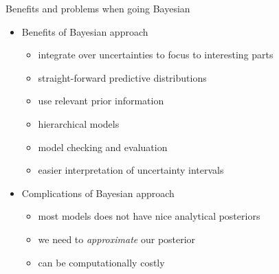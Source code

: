 \documentclass[10pt]{beamer}
\begin{document}


\begin{frame}{Benefits and problems when going Bayesian}

  \begin{itemize}
  \item Benefits of Bayesian approach
    \begin{itemize}
    \item integrate over uncertainties to focus to interesting parts
    \item straight-forward predictive distributions
    \item use relevant prior information
    \item hierarchical models
    \item model checking and evaluation
    \item easier interpretation of uncertainty intervals
    \end{itemize}
  \item Complications of Bayesian approach
    \begin{itemize}
    \item most models does not have nice analytical posteriors
    \item we need to \emph{approximate} our posterior
    \item can be computationally costly
    \end{itemize}
  \end{itemize}
\end{frame}
\end{document}
